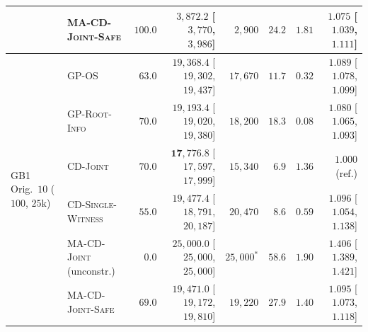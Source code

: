\documentclass{article}
\theoremstyle{plain}
\theoremstyle{definition}
\begin{document}
\begin{table}[!htbp]
{\begin{tabular}{@{}llrrrrrr@{}}
  & \textsc{MA-CD-Joint-Safe}        & $100.0$ & $3{,}872.2$ [$3{,}770$, $3{,}986$]   & $2{,}900$  & $24.2$ & $1.81$ & $1.075$ [$1.039$, $1.111$] \\
\midrule
\multirow{6}{*}{GB1 Orig.\ $10$ ($100$, $25\mathrm{k}$)}
  & \textsc{GP-OS}                   & $63.0$  & $19{,}368.4$ [$19{,}302$, $19{,}437$] & $17{,}670$ & $11.7$ & $0.32$ & $1.089$ [$1.078$, $1.099$] \\
  & \textsc{GP-Root-Info}            & $70.0$  & $19{,}193.4$ [$19{,}020$, $19{,}380$] & $18{,}200$ & $18.3$ & $0.08$ & $1.080$ [$1.065$, $1.093$] \\
  & \textsc{CD-Joint}                & $70.0$  & $\mathbf{17{,}776.8}$ [$17{,}597$, $17{,}999$] & $15{,}340$ & $6.9$  & $1.36$ & $1.000$ (ref.) \\
  & \textsc{CD-Single-Witness}       & $55.0$  & $19{,}477.4$ [$18{,}791$, $20{,}187$] & $20{,}470$ & $8.6$  & $0.59$ & $1.096$ [$1.054$, $1.138$] \\
  & \textsc{MA-CD-Joint} (unconstr.) & $0.0$   & $25{,}000.0$ [$25{,}000$, $25{,}000$] & $25{,}000^*$ & $58.6$ & $1.90$ & $1.406$ [$1.389$, $1.421$] \\
  & \textsc{MA-CD-Joint-Safe}        & $69.0$  & $19{,}471.0$ [$19{,}172$, $19{,}810$] & $19{,}220$ & $27.9$ & $1.40$ & $1.095$ [$1.073$, $1.118$] \\
\bottomrule
\end{tabular}%
}
\end{table}
\end{document}
